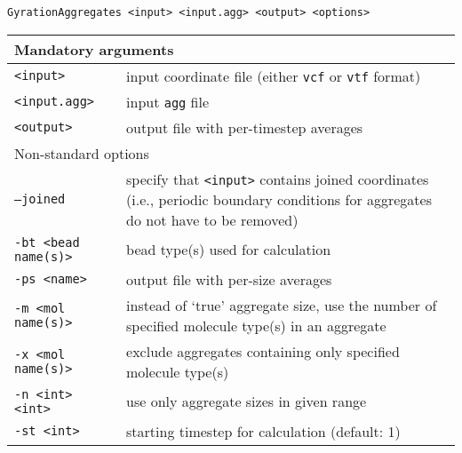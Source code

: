 \vspace{1em}
\noindent
\texttt{GyrationAggregates <input> <input.agg> <output> <options>}

\noindent
\begin{longtable}{p{}p{}}
  \toprule
  \multicolumn{2}{l}{Mandatory arguments} \\
  \midrule
  \texttt{<input>} & input coordinate file (either \texttt{vcf} or
    \texttt{vtf} format) \\
  \texttt{<input.agg>} & input \texttt{agg} file \\
  \texttt{<output>} & output file with per-timestep averages \\
  \toprule
  \multicolumn{2}{l}{Non-standard options} \\
  \midrule
  \texttt{--joined} & specify that \texttt{<input>} contains joined
    coordinates (i.e., periodic boundary conditions for aggregates do not
    have to be removed) \\
  \texttt{-bt <bead name(s)>} & bead type(s) used for calculation \\
  \texttt{-ps <name>} & output file with per-size averages \\
  \texttt{-m <mol name(s)>} & instead of `true' aggregate size, use the number
    of specified molecule type(s) in an aggregate \\
  \texttt{-x <mol name(s)>} & exclude aggregates containing only specified
    molecule type(s) \\
  \texttt{-n <int> <int>} & use only aggregate sizes in given range \\
  \texttt{-st <int>} & starting timestep for calculation (default: 1) \\
  \bottomrule
\end{longtable}

